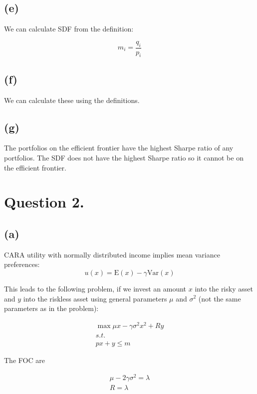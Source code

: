\documentclass{article}
\begin{document}
\subsection{(e)}

We can calculate SDF from the definition:

\begin{equation}
m_i = \frac{q_i}{p_i}
\end{equation}

\subsection{(f)}

We can calculate these using the definitions.

\subsection{(g)}

The portfolios on the efficient frontier have the highest Sharpe ratio of any portfolios. The SDF does not have the highest Sharpe ratio so it cannot be on the efficient frontier.

\section{Question 2.}

\subsection{(a)}

CARA utility with normally distributed income implies mean variance preferences:
\begin{equation}
u(x) = \mathrm{E}(x) - \gamma \mathrm{Var}(x)
\end{equation}

This leads to the following problem, if we invest an amount $x$ into the risky asset and $y$ into the riskless asset using general parameters $\mu$ and $\sigma^2$ (not the same parameters as in the problem):

\begin{align}
\max \mu x- \gamma \sigma^2 x^2 + Ry \\
s.t. \\
px+y \leq m
\end{align}

The FOC are

\begin{align}
\mu - 2 \gamma \sigma^2 = \lambda \\
 R = \lambda
\end{align}
\end{document}
